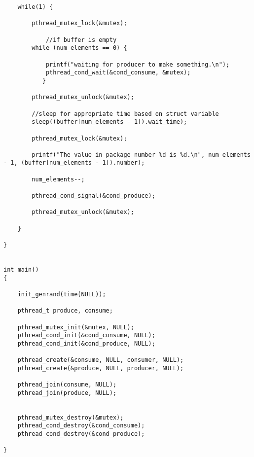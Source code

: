 \documentclass[letterpaper,
10pt, titlepage, draftclsnofoot, onecolumn]{IEEEtran}
\begin{document}
\begin{lstlisting}
	while(1) {

		pthread_mutex_lock(&mutex);

	    	//if buffer is empty
		while (num_elements == 0) {

			printf("waiting for producer to make something.\n");
			pthread_cond_wait(&cond_consume, &mutex);
	       }

		pthread_mutex_unlock(&mutex);

		//sleep for appropriate time based on struct variable
		sleep((buffer[num_elements - 1]).wait_time);

		pthread_mutex_lock(&mutex);

		printf("The value in package number %d is %d.\n", num_elements - 1, (buffer[num_elements - 1]).number);

		num_elements--;

		pthread_cond_signal(&cond_produce);

		pthread_mutex_unlock(&mutex);

	}

}


int main()
{

	init_genrand(time(NULL));

	pthread_t produce, consume;

	pthread_mutex_init(&mutex, NULL);
	pthread_cond_init(&cond_consume, NULL);
	pthread_cond_init(&cond_produce, NULL);

	pthread_create(&consume, NULL, consumer, NULL);
	pthread_create(&produce, NULL, producer, NULL);

	pthread_join(consume, NULL);
	pthread_join(produce, NULL);


	pthread_mutex_destroy(&mutex);
	pthread_cond_destroy(&cond_consume);
	pthread_cond_destroy(&cond_produce);

}

\end{lstlisting}



\end{document}
